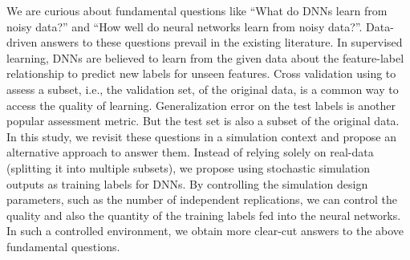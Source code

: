 We are curious about fundamental questions like ``What do DNNs learn from noisy data?'' and ``How well do neural networks learn from noisy data?''.
Data-driven answers to these questions prevail in the existing literature.
In supervised learning, DNNs are believed to learn from the given data about the feature-label relationship to predict new labels for unseen features.
Cross validation using to assess a subset, i.e., the validation set, of the original data, is a common way to access the quality of learning.
Generalization error on the test labels is another popular assessment metric.
But the test set is also a subset of the original data.
In this study, we revisit these questions in a simulation context and propose an alternative approach to answer them.
Instead of relying solely on real-data (splitting it into multiple subsets), we propose using stochastic simulation outputs as training labels for DNNs.
By controlling the simulation design parameters, such as the number of independent replications, we can control the quality and also the quantity of the training labels fed into the neural networks.
In such a controlled environment, we obtain more clear-cut answers to the above fundamental questions.

